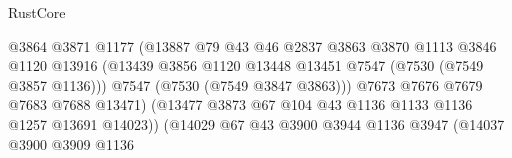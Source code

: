 \begin{lexlean}{RustCore}
\begin{coremodule}
                                            @3864
                                            @3871
                                            @1177
                                            (@13887
                                              @79
                                              @43
                                              @46
                                              @2837
                                              @3863
                                              @3870
                                              @1113
                                              @3846
                                              @1120
                                              @13916
                                              (@13439
                                                @3856
                                                @1120
                                                @13448
                                                @13451
                                                @7547
                                                (@7530 (@7549 @3857 @1136)))
                                              @7547
                                              (@7530 (@7549 @3847 @3863)))
                                            @7673
                                            @7676
                                            @7679
                                            @7683
                                            @7688
                                            @13471)
                                          (@13477
                                            @3873
                                            @67
                                            @104
                                            @43
                                            @1136
                                            @1133
                                            @1136
                                            @1257
                                            @13691
                                            @14023))
                                        (@14029
                                          @67
                                          @43
                                          @3900
                                          @3944
                                          @1136
                                          @3947
                                          (@14037
                                            @3900
                                            @3909
                                            @1136

\end{coremodule}
\end{lexlean}
